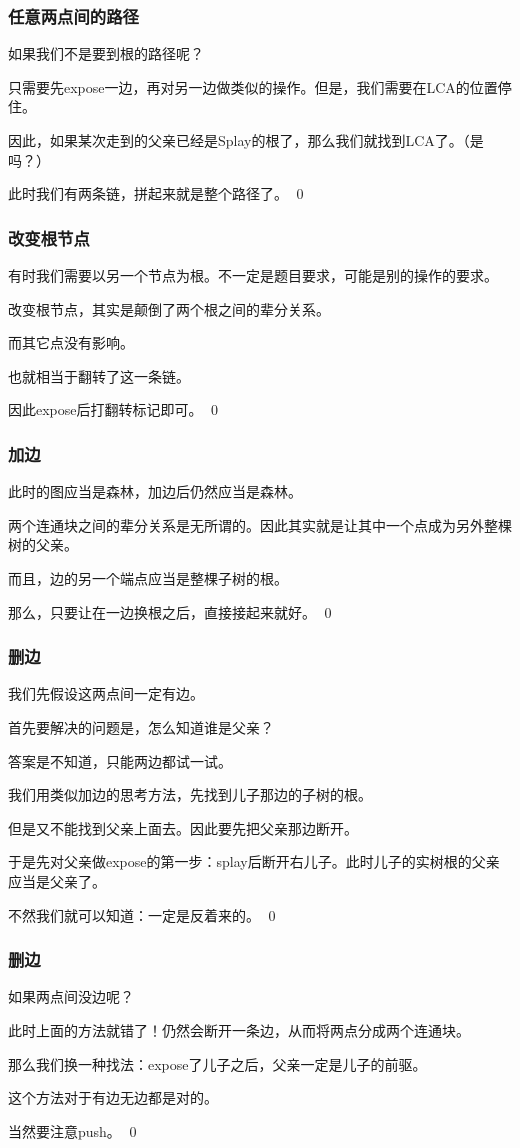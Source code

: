 \documentclass[9pt,dvipsnames,table]{beamer}
\newenvironment{qedframe}{%
	\begin{frame}[environment=qedqedframe]%
	}{%
	\qed
	\end{frame}%
}
\begin{document}
\begin{qedframe}
	\frametitle{任意两点间的路径}
	如果我们不是要到根的路径呢？\pause
	
	只需要先expose一边，再对另一边做类似的操作。但是，我们需要在LCA的位置停住。
	
	因此，如果某次走到的父亲已经是Splay的根了，那么我们就找到LCA了。（是吗？）
	
	此时我们有两条链，拼起来就是整个路径了。
\end{qedframe}
\begin{qedframe}
	\frametitle{改变根节点}
	有时我们需要以另一个节点为根。不一定是题目要求，可能是别的操作的要求。\pause
	
	改变根节点，其实是颠倒了两个根之间的辈分关系。
	
	而其它点没有影响。\pause
	
	也就相当于翻转了这一条链。
	
	因此expose后打翻转标记即可。
\end{qedframe}
\begin{qedframe}
	\frametitle{加边}
	此时的图应当是森林，加边后仍然应当是森林。\pause
	
	两个连通块之间的辈分关系是无所谓的。因此其实就是让其中一个点成为另外整棵树的父亲。
	
	而且，边的另一个端点应当是整棵子树的根。\pause
	
	那么，只要让在一边换根之后，直接接起来就好。
\end{qedframe}
\begin{qedframe}
	\frametitle{删边}
	我们先假设这两点间一定有边。\pause
	
	首先要解决的问题是，怎么知道谁是父亲？\pause
	
	答案是不知道，只能两边都试一试。
	
	我们用类似加边的思考方法，先找到儿子那边的子树的根。\pause
	
	但是又不能找到父亲上面去。因此要先把父亲那边断开。
	
	于是先对父亲做expose的第一步：splay后断开右儿子。此时儿子的实树根的父亲应当是父亲了。
	
	不然我们就可以知道：一定是反着来的。
\end{qedframe}
\begin{qedframe}
	\frametitle{删边}
	如果两点间没边呢？\pause
	
	此时上面的方法就错了！仍然会断开一条边，从而将两点分成两个连通块。\pause
	
	那么我们换一种找法：expose了儿子之后，父亲一定是儿子的前驱。
	
	这个方法对于有边无边都是对的。
	
	当然要注意push。
\end{qedframe}
\end{document}
